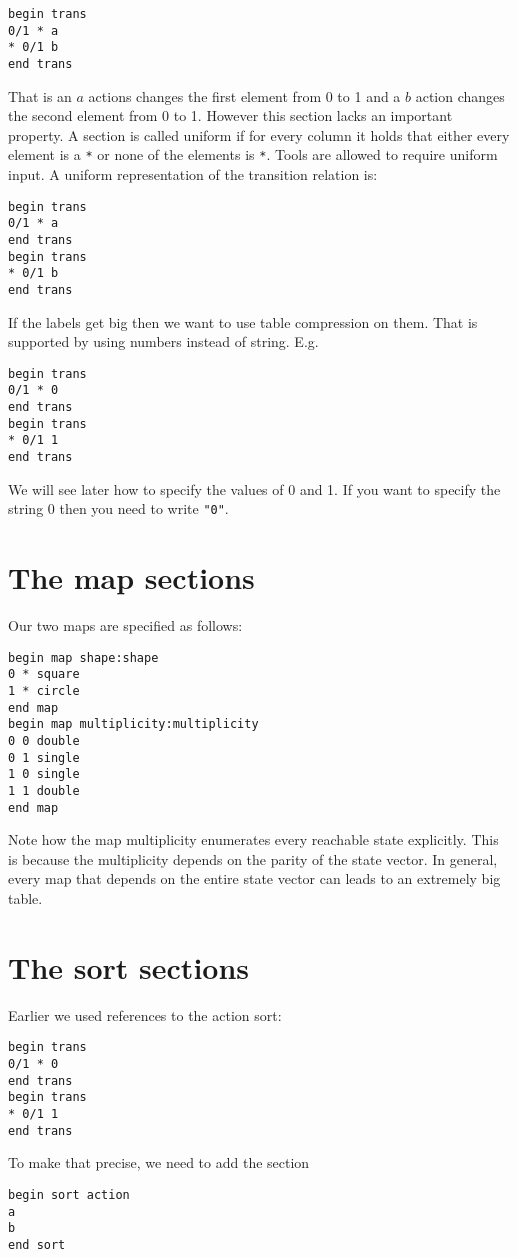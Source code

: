 \begin{verbatim}
begin trans
0/1 * a
* 0/1 b
end trans
\end{verbatim}
That is an $a$ actions changes the first element from 0 to 1 and
a $b$ action changes the second element from 0 to 1. However this section lacks
an important property. A section is called uniform if for every column it
holds that either every element is a \verb+*+ or none of the elements is \verb+*+.
Tools are allowed to require uniform input. A uniform representation
of the transition relation is:
\begin{verbatim}
begin trans
0/1 * a
end trans
begin trans
* 0/1 b
end trans
\end{verbatim}
If the labels get big then we want to use table compression on them.
That is supported by using numbers instead of string. E.g.
\begin{verbatim}
begin trans
0/1 * 0
end trans
begin trans
* 0/1 1
end trans
\end{verbatim}
We will see later how to specify the values of 0 and 1.
If you want to specify the string 0 then you need to write \verb+"0"+.

\section{The map sections}

Our two maps are specified as follows:
\begin{verbatim}
begin map shape:shape
0 * square
1 * circle
end map
begin map multiplicity:multiplicity
0 0 double
0 1 single
1 0 single
1 1 double
end map
\end{verbatim}
Note how the map multiplicity enumerates every reachable state explicitly.
This is because the multiplicity depends on the parity of the state vector.
In general, every map that depends on the entire state vector can leads
to an extremely big table. 

\section{The sort sections}

Earlier we used references to the action sort:
\begin{verbatim}
begin trans
0/1 * 0
end trans
begin trans
* 0/1 1
end trans
\end{verbatim}
To make that precise, we need to add the section

\begin{verbatim}
begin sort action
a
b
end sort
\end{verbatim}

